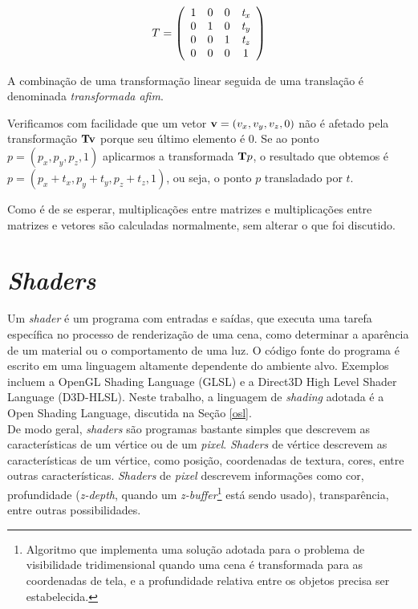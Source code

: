 \[ T = \left(
\begin{array}{cccc}
1 & 0 & 0 & {\it t_{x}} \\
0 & 1 & 0 & {\it t_{y}} \\
0 & 0 & 1 & {\it t_{z}} \\
0 & 0 & 0 & 1 
\end{array} \right)
\]

A combinação de uma transformação linear seguida de uma translação é denominada {\it transformada afim}.

Verificamos com facilidade que um vetor ${\bf v} = (v_{x},v_{y},v_{z},0)$ não é afetado pela transformação ${\bf Tv}$ porque seu último elemento é 0. Se ao ponto $p= (p_{x},p_{y},p_{z},1)$ aplicarmos a transformada ${\bf T}p$, o resultado que obtemos é $p= (p_{x} + t_{x},p_{y} + t_{y},p_{z} + t_{z},1)$, ou seja, o ponto $p$ transladado por $t$.

Como é de se esperar, multiplicações entre matrizes e multiplicações entre matrizes e vetores são calculadas normalmente, sem alterar o que foi discutido.


\section{\emph{Shaders}}
\label{shaders}

Um \emph{shader} é um programa com entradas e saídas, que executa uma tarefa específica no processo de renderização de uma cena, como determinar a aparência de um material ou o comportamento de uma luz. O código fonte do programa é escrito em uma linguagem altamente dependente do ambiente alvo. Exemplos incluem a OpenGL Shading Language (GLSL) e a Direct3D High Level Shader Language (D3D-HLSL). Neste trabalho, a linguagem de \emph{shading} adotada é a Open Shading Language, discutida na Seção \ref{osl}.\\

De modo geral, \emph{shaders} são programas bastante simples que descrevem as características de um vértice ou de um \emph{pixel}. \emph{Shaders} de vértice descrevem as características de um vértice, como posição, coordenadas de textura, cores, entre outras características. \emph{Shaders} de \emph{pixel} descrevem informações como cor, profundidade (\emph{z-depth}, quando um \emph{z-buffer}\footnote{Algoritmo que implementa uma solução adotada para o problema de visibilidade tridimensional quando uma cena é transformada para as coordenadas de tela, e a profundidade relativa entre os objetos precisa ser estabelecida.} está sendo usado), transparência, entre outras possibilidades. 


